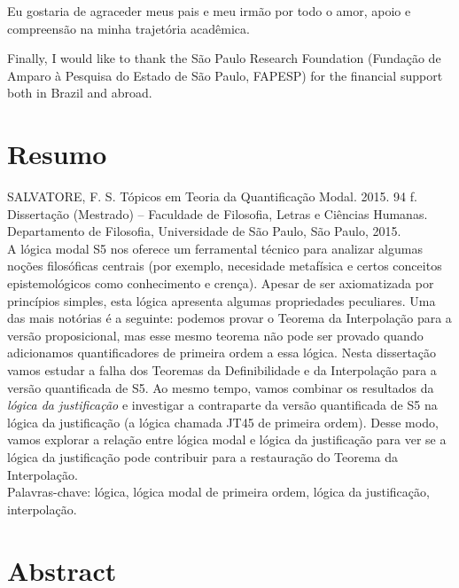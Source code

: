 \documentclass[12pt]{report}
\theoremstyle{definition}
\begin{document}
\qquad Eu gostaria de agraceder meus pais e meu irm\~ao por todo o amor, apoio e compreens\~ao na minha trajet\'oria acad\^emica. 

\qquad Finally, I would like to thank the S\~ao Paulo Research Foundation (Funda\c{c}\~ao de Amparo \`a Pesquisa do Estado de S\~ao Paulo, FAPESP) for the financial support both in Brazil and abroad.



\chapter*{Resumo}

SALVATORE, F. S. T\'opicos em Teoria da Quantifica\c{c}\~ao Modal. 2015. 94 f. Disserta\c{c}\~ao (Mestrado) -- Faculdade de Filosofia, Letras e Ci\^encias Humanas. Departamento de Filosofia, Universidade de S\~ao Paulo, S\~ao Paulo, 2015.  \\


A l\'ogica modal S5 nos oferece um ferramental t\'ecnico para analizar algumas no\c{c}\~oes filos\'oficas centrais (por exemplo,  necesidade metaf\'isica e certos conceitos epistemol\'ogicos como conhecimento e cren\c{c}a). Apesar de ser axiomatizada por princ\'ipios simples, esta l\'ogica apresenta algumas propriedades peculiares. Uma das mais not\'orias \'e a seguinte: podemos provar o Teorema da Interpola\c{c}\~ao para a vers\~ao proposicional, mas esse mesmo teorema n\~ao pode ser provado quando adicionamos quantificadores de primeira ordem a essa l\'ogica. Nesta disserta\c{c}\~ao vamos estudar a falha dos Teoremas da Definibilidade e da Interpola\c{c}\~ao para a vers\~ao quantificada de S5. Ao mesmo tempo, vamos combinar os resultados da \textit{l\'ogica da justifica\c{c}\~ao} e investigar a contraparte da vers\~ao quantificada de S5 na l\'ogica da justifica\c{c}\~ao (a l\'ogica chamada JT45 de primeira ordem). Desse modo, vamos explorar a rela\c{c}\~ao entre l\'ogica modal e l\'ogica da justifica\c{c}\~ao para ver se a l\'ogica da justifica\c{c}\~ao pode contribuir para a restaura\c{c}\~ao do Teorema da Interpola\c{c}\~ao.\\

Palavras-chave: l\'ogica, l\'ogica modal de primeira ordem, l\'ogica da justifica\c{c}\~ao, interpola\c{c}\~ao.  
 

\chapter*{Abstract}
\end{document}
